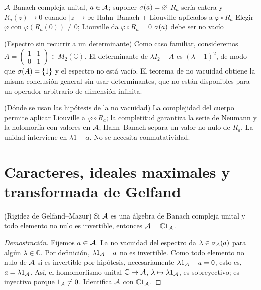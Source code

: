 \proofdiagrambranch
{$\mathcal A$ Banach compleja unital, $a\in\mathcal A$; suponer $\sigma(a)=\varnothing$}
{$R_a$ sería entera y $R_a(z)\to0$ cuando $|z|\to\infty$}
{Hahn--Banach + Liouville aplicados a $\varphi\circ R_a$}
{Elegir $\varphi$ con $\varphi(R_a(0))\ne0$; Liouville da $\varphi\circ R_a=0$}
{$\sigma(a)$ debe ser no vacío}

\begin{cthejemplo}{(Espectro sin recurrir a un determinante)}
Como caso familiar, consideremos
$A=\begin{pmatrix}1&1\\0&1\end{pmatrix}\in M_2(\mathbb C)$.
El determinante de $\lambda I_2-A$ es $(\lambda-1)^2$, de modo que
$\sigma(A)=\{1\}$ y el espectro no está vacío.
El teorema de no vacuidad obtiene la misma conclusión general sin
usar determinantes, que no están disponibles para un operador
arbitrario de dimensión infinita.
\end{cthejemplo}

\begin{cthnota}{(Dónde se usan las hipótesis de la no vacuidad)}
La complejidad del cuerpo permite aplicar Liouville a $\varphi\circ R_a$; la completitud
garantiza la serie de Neumann y la holomorfía con valores en $\mathcal A$; Hahn--Banach separa un
valor no nulo de $R_a$. La unidad interviene en $\lambda1-a$. No se necesita
conmutatividad.
\end{cthnota}

\section{Caracteres, ideales maximales y transformada de Gelfand}

\begin{cthteorema}{(Rigidez de Gelfand--Mazur)}
Si $\mathcal A$ es una álgebra de Banach compleja unital y todo elemento no nulo
es invertible, entonces
$\mathcal A=\mathbb C1_\mathcal A$.
\end{cthteorema}

\begin{proof}[Demostración]
Fijemos $a\in\mathcal A$. La no vacuidad del espectro da
$\lambda\in\sigma_\mathcal A(a)$ para algún $\lambda\in\mathbb C$.
Por definición, $\lambda1_\mathcal A-a$ no es invertible. Como todo elemento
no nulo de $\mathcal A$ sí es invertible por hipótesis, necesariamente
$\lambda1_\mathcal A-a=0$, esto es, $a=\lambda1_\mathcal A$.
Así, el homomorfismo unital $\mathbb C\to\mathcal A$,
$\lambda\mapsto\lambda1_\mathcal A$, es sobreyectivo; es inyectivo porque
$1_\mathcal A\ne0$. Identifica $\mathcal A$ con $\mathbb C1_\mathcal A$.
\end{proof}

